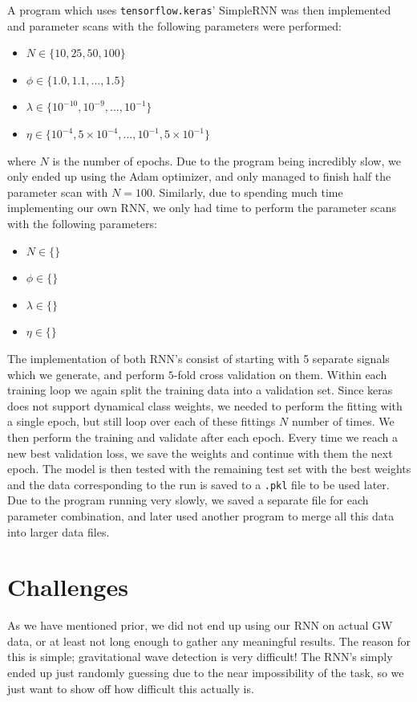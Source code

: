 \documentclass[%
reprint,
amsmath,amssymb,
aps,
]{revtex4-2}
\begin{document}
A program which uses \texttt{tensorflow.keras}' SimpleRNN was then implemented and parameter scans with the following parameters were performed:
\begin{itemize}
	\item $N\in\{10,25,50,100\}$
	\item $\phi\in\{1.0,1.1,...,1.5\}$
	\item $\lambda\in\{10^{-10},10^{-9},...,10^{-1}\}$
	\item $\eta\in\{10^{-4},5\times10^{-4},...,10^{-1},5\times10^{-1}\}$
\end{itemize}
where $N$ is the number of epochs. Due to the program being incredibly slow, we only ended up using the Adam optimizer, and only managed to finish half the parameter scan with $N=100$. Similarly, due to spending much time implementing our own RNN, we only had time to perform the parameter scans with the following parameters:
\begin{itemize}
	\item $N\in\{\}$
	\item $\phi\in\{\}$
	\item $\lambda\in\{\}$
	\item $\eta\in\{\}$
\end{itemize}
The implementation of both RNN's consist of starting with 5 separate signals which we generate, and perform $5$-fold cross validation on them. Within each training loop we again split the training data into a validation set. Since keras does not support dynamical class weights, we needed to perform the fitting with a single epoch, but still loop over each of these fittings $N$ number of times. We then perform the training and validate after each epoch. Every time we reach a new best validation loss, we save the weights and continue with them the next epoch. The model is then tested with the remaining test set with the best weights and the data corresponding to the run is saved to a \texttt{.pkl} file to be used later. Due to the program running very slowly, we saved a separate file for each parameter combination, and later used another program to merge all this data into larger data files.

\section{Challenges}
As we have mentioned prior, we did not end up using our RNN on actual GW data, or at least not long enough to gather any meaningful results. The reason for this is simple; gravitational wave detection is very difficult! The RNN's simply ended up just randomly guessing due to the near impossibility of the task, so we just want to show off how difficult this actually is.
\end{document}
